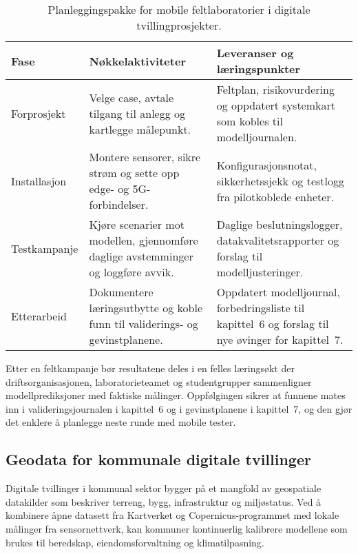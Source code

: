 \begin{table}[ht]
    \centering
    \caption{Planleggingspakke for mobile feltlaboratorier i digitale tvillingprosjekter.}
    \label{tab:kap02-mobilelab}
    \begin{tabular}{p{}p{}p{}}
        \toprule
        \textbf{Fase} & \textbf{Nøkkelaktiviteter} & \textbf{Leveranser og læringspunkter} \\
        \midrule
        Forprosjekt & Velge case, avtale tilgang til anlegg og kartlegge målepunkt. & Feltplan, risikovurdering og oppdatert systemkart som kobles til modelljournalen. \\
        Installasjon & Montere sensorer, sikre strøm og sette opp edge- og 5G-forbindelser. & Konfigurasjonsnotat, sikkerhetssjekk og testlogg fra pilotkoblede enheter. \\
        Testkampanje & Kjøre scenarier mot modellen, gjennomføre daglige avstemminger og loggføre avvik. & Daglige beslutningslogger, datakvalitetsrapporter og forslag til modelljusteringer. \\
        Etterarbeid & Dokumentere læringsutbytte og koble funn til validerings- og gevinstplanene. & Oppdatert modelljournal, forbedringsliste til kapittel~6 og forslag til nye øvinger for kapittel~7. \\
        \bottomrule
    \end{tabular}
\end{table}

Etter en feltkampanje bør resultatene deles i en felles læringsøkt der driftsorganisasjonen, laboratorieteamet og studentgrupper sammenligner modellprediksjoner med faktiske målinger. Oppfølgingen sikrer at funnene mates inn i valideringsjournalen i kapittel~6 og i gevinstplanene i kapittel~7, og den gjør det enklere å planlegge neste runde med mobile tester.

\subsection{Geodata for kommunale digitale tvillinger}
Digitale tvillinger i kommunal sektor bygger på et mangfold av geospatiale datakilder som beskriver terreng, bygg, infrastruktur og miljøstatus. Ved å kombinere åpne datasett fra Kartverket og Copernicus-programmet med lokale målinger fra sensornettverk, kan kommuner kontinuerlig kalibrere modellene som brukes til beredskap, eiendomsforvaltning og klimatilpasning.\citep{kartverket2023ndh,copernicus2024handbook}

